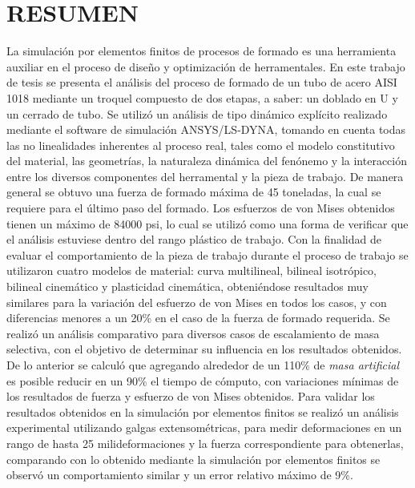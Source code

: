 \chapter*{RESUMEN}


La simulación por elementos finitos de procesos de formado es una herramienta auxiliar en el proceso de 
diseño y optimización de herramentales. En este trabajo de tesis se presenta el análisis del proceso de formado 
de un tubo de acero AISI 1018 mediante un troquel compuesto de dos etapas, a saber: un doblado en U y un 
cerrado de tubo. Se utilizó un análisis de tipo dinámico explícito realizado mediante el software de simulación 
ANSYS/LS-DYNA\CR, tomando en cuenta todas las no linealidades inherentes al proceso real, tales 
como el modelo constitutivo del material, las geometrías, la naturaleza dinámica del fenónemo y la interacción 
entre los diversos componentes del herramental y la pieza de trabajo.
De manera general se obtuvo una fuerza de formado máxima de 45 toneladas, la cual se requiere para el último 
paso del formado. Los esfuerzos de von Mises obtenidos tienen un máximo de 84000 psi, lo cual se utilizó 
como una forma de verificar que el análisis estuviese dentro del rango plástico de trabajo.
Con la finalidad de evaluar el comportamiento de la pieza de trabajo durante el proceso de trabajo se 
utilizaron cuatro modelos de material: curva multilineal, bilineal isotrópico, bilineal cinemático y 
plasticidad cinemática, obteniéndose resultados muy similares para la variación del esfuerzo de von Mises 
en todos los casos, y con diferencias menores a un 20\% en el caso de la fuerza de formado requerida. 
Se realizó un análisis comparativo para diversos casos de escalamiento de masa selectiva, con el objetivo 
de determinar su influencia en los resultados obtenidos. De lo anterior se calculó que agregando alrededor de 
un 110\% de \textit{masa artificial} es posible reducir en un 90\% el tiempo de cómputo, con variaciones mínimas 
de los resultados de fuerza y esfuerzo de von Mises obtenidos. Para validar los resultados obtenidos en la simulación 
por elementos finitos se realizó un análisis experimental utilizando 
galgas extensométricas, para medir deformaciones en un rango de hasta 25 milideformaciones y la fuerza correspondiente 
para obtenerlas, comparando con lo obtenido mediante la simulación por elementos finitos se observó un 
comportamiento similar y un error relativo máximo de 9\%.
